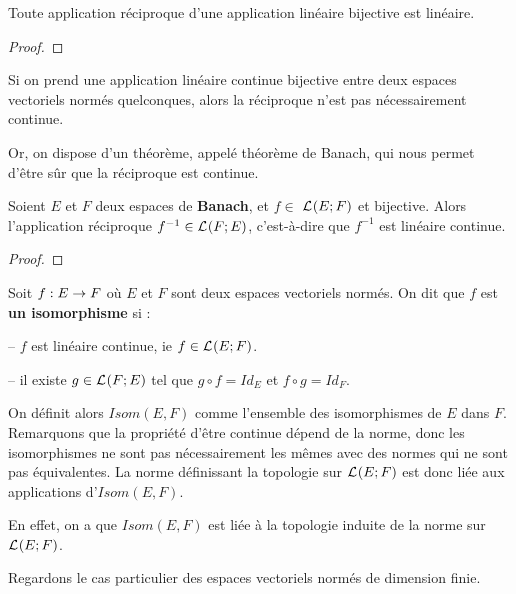 \begin{proposition}
	Toute application réciproque d'une application linéaire bijective est
	linéaire.
\end{proposition}

\ifdefined\outputproof
\begin{proof}

\end{proof}
\fi

Si on prend une application linéaire continue bijective entre deux espaces
vectoriels normés quelconques, alors la réciproque n'est pas nécessairement
continue.

Or, on dispose d'un théorème, appelé théorème de Banach, qui nous permet d'être
sûr que la réciproque est continue.

\begin{theorem} [Banach]
	\label{theorem_banach_isomorphism}
	Soient $E$ et $F$ deux espaces de \textbf{Banach}, et $f \in$
	$\mathcal{L}_{}(E; F)$ et bijective.
	Alors l'application réciproque $f^{-1} \in \mathcal{L}_{}(F; E)$,
	c'est-à-dire que $f^{-1}$ est linéaire continue.
\end{theorem}

\ifdefined\outputproof
\begin{proof}

\end{proof}
\fi

\begin{definition}
\label{definition:isomorphisme}
	Soit $f : E \rightarrow F$ où $E$ et $F$ sont deux espaces vectoriels
	normés.
	On dit que $f$ est \textbf{un isomorphisme} si :

	-- $f$ est linéaire continue, ie $f \in \mathcal{L}_{}(E; F)$.

	-- il existe $g \in \mathcal{L}_{}(F; E)$ tel que $g \circ f = Id_{E}$ et
	$f \circ g = Id_{F}$.
\end{definition}

On définit alors $Isom(E, F)$ comme l'ensemble des isomorphismes de $E$ dans
$F$.
Remarquons que la propriété d'être continue dépend de la norme, donc les
isomorphismes ne sont pas nécessairement les mêmes avec des normes qui ne sont
pas équivalentes. La norme définissant la topologie sur $\mathcal{L}_{}(E; F)$
est donc liée aux applications d'$Isom(E, F)$.

En effet, on a que $Isom(E, F)$ est liée à la topologie induite de la norme sur
$\mathcal{L}_{}(E; F)$.

Regardons le cas particulier des espaces vectoriels normés de dimension finie.


